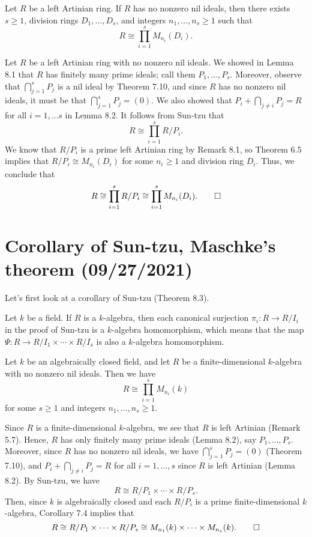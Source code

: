 \begin{theo}{}
Let $R$ be a left Artinian ring. If $R$ has no nonzero nil ideals, then there exists $s \geq 1$, 
division rings $D_1, \dots, D_s$, and integers $n_1, \dots, n_s \geq 1$ such that 
\[ R \cong \prod_{i=1}^s M_{n_i}(D_i). \]
\end{theo}
\begin{pf}
Let $R$ be a left Artinian ring with no nonzero nil ideals. We showed in Lemma 8.1 that $R$ 
has finitely many prime ideals; call them $P_1, \dots, P_s$. Moreover, observe that $\bigcap_{j=1}^s P_j$ is a nil ideal by Theorem 7.10, and since $R$ has no nonzero nil ideals, it must be that 
$\bigcap_{j=1}^s P_j = (0)$. We also showed that $P_i + \bigcap_{j\neq i} P_j = R$ for all 
$i = 1, \dots s$ in Lemma 8.2. It follows from Sun-tzu that 
\[ R \cong \prod_{i=1}^s R/P_i. \] 
We know that $R/P_i$ is a prime left Artinian ring by Remark 8.1, so Theorem 6.5 implies that 
$R/P_i \cong M_{n_i}(D_i)$ for some $n_i \geq 1$ and division ring $D_i$. Thus, we conclude that 
\[ R \cong \prod_{i=1}^s R/P_i \cong \prod_{i=1}^s M_{n_i}(D_i). \qedhere \]
\end{pf}

\section{Corollary of Sun-tzu, Maschke's theorem (09/27/2021)}

Let's first look at a corollary of Sun-tzu (Theorem 8.3).

\begin{remark}{}
Let $k$ be a field. If $R$ is a $k$-algebra, then each canonical surjection $\pi_i : R \to R/I_i$ 
in the proof of Sun-tzu is a $k$-algebra homomorphism, which means that the map
$\Psi : R \to R/I_1 \times \cdots \times R/I_s$ is also a $k$-algebra homomorphism. 
\end{remark}

\begin{cor}{}
Let $k$ be an algebraically closed field, and let $R$ be a finite-dimensional $k$-algebra with no nonzero
nil ideals. Then we have 
\[ R \cong \prod_{i=1}^s M_{n_i}(k) \]
for some $s \geq 1$ and integers $n_1, \dots, n_s \geq 1$. 
\end{cor}
\begin{pf}
Since $R$ is a finite-dimensional $k$-algebra, we see that $R$ is left Artinian (Remark 5.7).
Hence, $R$ has only finitely many prime ideals (Lemma 8.2), say $P_1, \dots, P_s$. Moreover, 
since $R$ has no nonzero nil ideals, we have $\bigcap_{j=1}^s P_j = (0)$ (Theorem 7.10), and 
$P_i + \bigcap_{j\neq i} P_j = R$ for all $i = 1, \dots, s$ since $R$ is left Artinian (Lemma 8.2). 
By Sun-tzu, we have 
\[ R \cong R/P_1 \times \cdots \times R/P_s. \]
Then, since $k$ is algebraically closed and each $R/P_i$ is a prime finite-dimensional $k$-algebra, 
Corollary 7.4 implies that 
\[ R \cong R/P_1 \times \cdots \times R/P_s \cong M_{n_1}(k) \times \cdots \times M_{n_s}(k). 
\qedhere \]
\end{pf}

